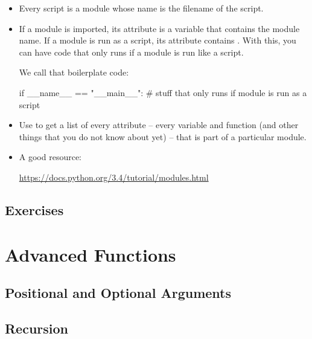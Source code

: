 \documentclass[11pt]{cselabheader}
\begin{document}
{\begin{itemize}
    Attributes can be functions defined in the module or variables defined in
    the module. A special attribute is , which contains
    the name of the module unless the module is executed as a script.

  \item Every script is a module whose name is the filename of the script.

  \item If a module is imported, its  attribute is a
    variable that contains the module name. If a module is run as a script, its
     attribute contains . With
    this, you can have code that only runs if a module is run like a script.

    We call that boilerplate code:

    \begin{python3code}
if __name__ == "__main__":
    # stuff that only runs if module is run as a script
    \end{python3code}

  \item Use  to get a list of every attribute -- every
    variable and function (and other things that you do not know about yet) --
    that is part of a particular module.

  \item A good resource:

    \begin{center}
\url{https://docs.python.org/3.4/tutorial/modules.html}
    \end{center}
\end{itemize}

\subsection{Exercises}
\label{subsec:modules.ex}

\pagebreak
\section{Advanced Functions}
\label{sec:adv}

\subsection{Positional and Optional Arguments}
\label{subsec:adv.args}

\subsection{Recursion}
\label{subsec:adv.recursion}

}
\end{document}
